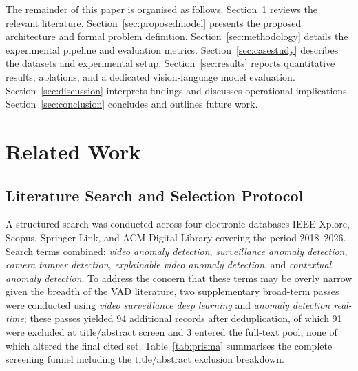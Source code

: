 \documentclass[a4paper,fleqn]{cas-dc}
\begin{document}
The remainder of this paper is organised as follows. Section~\ref{sec:relatedwork} reviews the relevant literature. Section~\ref{sec:proposedmodel} presents the proposed architecture and formal problem definition. Section~\ref{sec:methodology} details the experimental pipeline and evaluation metrics. Section~\ref{sec:casestudy} describes the datasets and experimental setup. Section~\ref{sec:results} reports quantitative results, ablations, and a dedicated vision-language model evaluation. Section~\ref{sec:discussion} interprets findings and discusses operational implications. Section~\ref{sec:conclusion} concludes and outlines future work.
 
 
 
 


\FloatBarrier
\section{Related Work}
\label{sec:relatedwork}
 
\FloatBarrier
\subsection{Literature Search and Selection Protocol}
 
A structured search was conducted across four electronic databases IEEE Xplore, Scopus, Springer Link, and ACM Digital Library covering the period 2018--2026. Search terms combined: \emph{video anomaly detection}, \emph{surveillance anomaly detection}, \emph{camera tamper detection}, \emph{explainable video anomaly detection}, and \emph{contextual anomaly detection}. To address the concern that these terms may be overly narrow given the breadth of the VAD literature, two supplementary broad-term passes were conducted using \emph{video surveillance deep learning} and \emph{anomaly detection real-time}; these passes yielded 94 additional records after deduplication, of which 91 were excluded at title/abstract screen and 3 entered the full-text pool, none of which altered the final cited set. Table~\ref{tab:prisma} summarises the complete screening funnel including the title/abstract exclusion breakdown.
 
\end{document}
